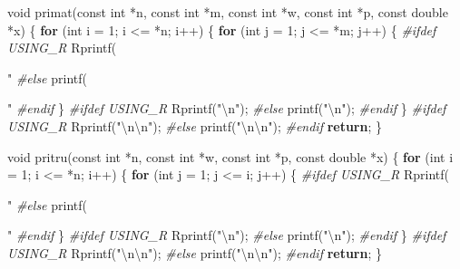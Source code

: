 \documentclass[12pt,]{article}
\newenvironment{Shaded}{\begin{snugshade}}{\end{snugshade}}
\newcommand{\ControlFlowTok}[1]{\textcolor[rgb]{0.13,0.29,0.53}{\textbf{#1}}}
\newcommand{\DataTypeTok}[1]{\textcolor[rgb]{0.13,0.29,0.53}{#1}}
\newcommand{\DecValTok}[1]{\textcolor[rgb]{0.00,0.00,0.81}{#1}}
\newcommand{\NormalTok}[1]{#1}
\newcommand{\PreprocessorTok}[1]{\textcolor[rgb]{0.56,0.35,0.01}{\textit{#1}}}
\newcommand{\SpecialCharTok}[1]{\textcolor[rgb]{0.00,0.00,0.00}{#1}}
\newcommand{\StringTok}[1]{\textcolor[rgb]{0.31,0.60,0.02}{#1}}
\begin{document}
\begin{Shaded}
\begin{Highlighting}[]
\DataTypeTok{void}\NormalTok{ primat(}\DataTypeTok{const} \DataTypeTok{int}\NormalTok{ *n, }\DataTypeTok{const} \DataTypeTok{int}\NormalTok{ *m, }\DataTypeTok{const} \DataTypeTok{int}\NormalTok{ *w, }\DataTypeTok{const} \DataTypeTok{int}\NormalTok{ *p,}
            \DataTypeTok{const} \DataTypeTok{double}\NormalTok{ *x) \{}
  \ControlFlowTok{for}\NormalTok{ (}\DataTypeTok{int}\NormalTok{ i = }\DecValTok{1}\NormalTok{; i <= *n; i++) \{}
    \ControlFlowTok{for}\NormalTok{ (}\DataTypeTok{int}\NormalTok{ j = }\DecValTok{1}\NormalTok{; j <= *m; j++) \{}
\PreprocessorTok{#ifdef USING_R}
\NormalTok{      Rprintf(}\StringTok{" %
\PreprocessorTok{#else}
\NormalTok{      printf(}\StringTok{" %
\PreprocessorTok{#endif}
\NormalTok{    \}}
\PreprocessorTok{#ifdef USING_R}
\NormalTok{    Rprintf(}\StringTok{"}\SpecialCharTok{\textbackslash{}n}\StringTok{"}\NormalTok{);}
\PreprocessorTok{#else}
\NormalTok{    printf(}\StringTok{"}\SpecialCharTok{\textbackslash{}n}\StringTok{"}\NormalTok{);}
\PreprocessorTok{#endif}
\NormalTok{  \}}
\PreprocessorTok{#ifdef USING_R}
\NormalTok{  Rprintf(}\StringTok{"}\SpecialCharTok{\textbackslash{}n\textbackslash{}n}\StringTok{"}\NormalTok{);}
\PreprocessorTok{#else}
\NormalTok{  printf(}\StringTok{"}\SpecialCharTok{\textbackslash{}n\textbackslash{}n}\StringTok{"}\NormalTok{);}
\PreprocessorTok{#endif}
  \ControlFlowTok{return}\NormalTok{;}
\NormalTok{\}}

\DataTypeTok{void}\NormalTok{ pritru(}\DataTypeTok{const} \DataTypeTok{int}\NormalTok{ *n, }\DataTypeTok{const} \DataTypeTok{int}\NormalTok{ *w, }\DataTypeTok{const} \DataTypeTok{int}\NormalTok{ *p, }\DataTypeTok{const} \DataTypeTok{double}\NormalTok{ *x) \{}
  \ControlFlowTok{for}\NormalTok{ (}\DataTypeTok{int}\NormalTok{ i = }\DecValTok{1}\NormalTok{; i <= *n; i++) \{}
    \ControlFlowTok{for}\NormalTok{ (}\DataTypeTok{int}\NormalTok{ j = }\DecValTok{1}\NormalTok{; j <= i; j++) \{}
\PreprocessorTok{#ifdef USING_R}
\NormalTok{      Rprintf(}\StringTok{" %
\PreprocessorTok{#else}
\NormalTok{      printf(}\StringTok{" %
\PreprocessorTok{#endif}
\NormalTok{    \}}
\PreprocessorTok{#ifdef USING_R}
\NormalTok{    Rprintf(}\StringTok{"}\SpecialCharTok{\textbackslash{}n}\StringTok{"}\NormalTok{);}
\PreprocessorTok{#else}
\NormalTok{    printf(}\StringTok{"}\SpecialCharTok{\textbackslash{}n}\StringTok{"}\NormalTok{);}
\PreprocessorTok{#endif}
\NormalTok{  \}}
\PreprocessorTok{#ifdef USING_R}
\NormalTok{  Rprintf(}\StringTok{"}\SpecialCharTok{\textbackslash{}n\textbackslash{}n}\StringTok{"}\NormalTok{);}
\PreprocessorTok{#else}
\NormalTok{  printf(}\StringTok{"}\SpecialCharTok{\textbackslash{}n\textbackslash{}n}\StringTok{"}\NormalTok{);}
\PreprocessorTok{#endif}
  \ControlFlowTok{return}\NormalTok{;}
\NormalTok{\}}

}}}}
\end{Highlighting}
\end{Shaded}
\end{document}
